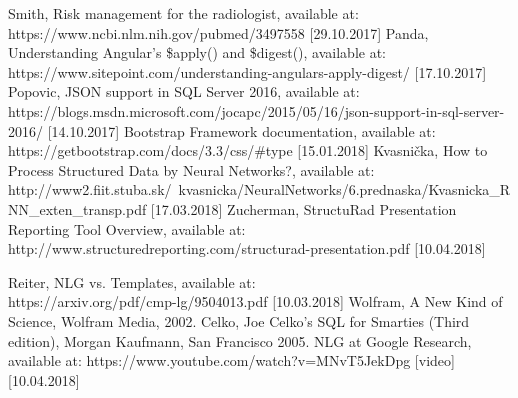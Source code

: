 \documentclass[12pt, twoside, openany]{report}
\theoremstyle{definition}
\begin{document}
\begin{thebibliography}{11}
 Smith, Risk management for the radiologist, available at:\\ https://www.ncbi.nlm.nih.gov/pubmed/3497558 [29.10.2017]
 Panda, Understanding Angular’s \$apply() and \$digest(), available at:\\ https://www.sitepoint.com/understanding-angulars-apply-digest/ [17.10.2017]
 Popovic, JSON support in SQL Server 2016, available at: \\
https://blogs.msdn.microsoft.com/jocapc/2015/05/16/json-support-in-sql-server-2016/ [14.10.2017]
 Bootstrap Framework documentation, available at: https://getbootstrap.com/docs/3.3/css/\#type [15.01.2018]
 Kvasnička, 
How to Process Structured 
Data by Neural Networks?, available at: \\http://www2.fiit.stuba.sk/~kvasnicka/NeuralNetworks/6.prednaska/Kvasnicka\_RNN\_exten\_transp.pdf [17.03.2018]
Zucherman, StructuRad Presentation
Reporting Tool Overview, available at: \\http://www.structuredreporting.com/structurad-presentation.pdf [10.04.2018]

 Reiter, NLG vs. Templates, available at: \\
https://arxiv.org/pdf/cmp-lg/9504013.pdf [10.03.2018]
Wolfram, A New Kind of Science, Wolfram Media, 2002.
Celko, Joe Celko's SQL for Smarties (Third edition), Morgan Kaufmann, San Francisco 2005.
 NLG at Google Research, available at:
 https://www.youtube.com/watch?v=MNvT5JekDpg [video] [10.04.2018]
\end{thebibliography}
\listoffigures
\end{document}

